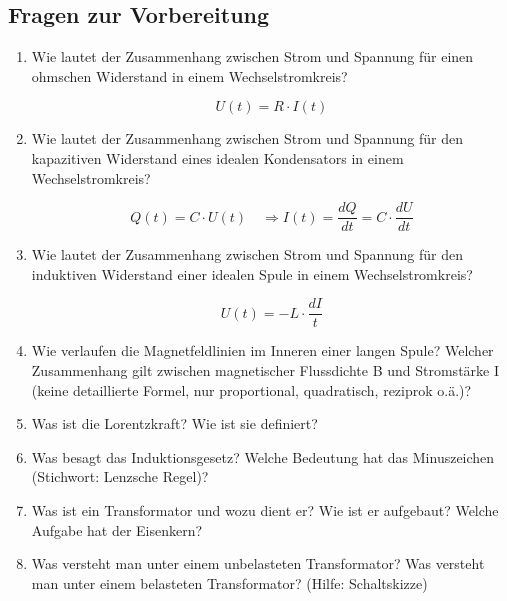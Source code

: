 \begin{tutorhint}
\section{Fragen zur Vorbereitung}


\begin{enumerate}
	\item Wie lautet der Zusammenhang zwischen Strom und Spannung für einen ohmschen Widerstand in einem Wechselstromkreis?
		\begin{solution}
			$$ U(t) = R\cdot I(t)$$
		\end{solution}
	\item Wie lautet der Zusammenhang zwischen Strom und Spannung für den kapazitiven Widerstand eines idealen Kondensators in einem Wechselstromkreis?
		\begin{solution}
			$$Q(t) = C\cdot U(t) \quad \Rightarrow I(t) = \frac{dQ}{dt} = C\cdot\frac{dU}{dt}$$
		\end{solution}
	\item Wie lautet der Zusammenhang zwischen Strom und Spannung für den induktiven Widerstand einer idealen Spule in einem Wechselstromkreis?
		\begin{solution}
			$$U(t) = -L\cdot\frac{dI}{t}$$
		\end{solution}
	\item Wie verlaufen die Magnetfeldlinien im Inneren einer langen Spule? Welcher Zusammenhang gilt zwischen magnetischer Flussdichte B und Stromstärke I (keine detaillierte Formel, nur proportional, quadratisch, reziprok o.ä.)?
	\item Was ist die Lorentzkraft? Wie ist sie definiert?
	\item Was besagt das Induktionsgesetz? Welche Bedeutung hat das Minuszeichen (Stichwort: Lenzsche Regel)?
	\item Was ist ein Transformator und wozu dient er? Wie ist er aufgebaut? Welche Aufgabe hat der Eisenkern?
	\item Was versteht man unter einem unbelasteten Transformator? Was versteht man unter einem belasteten Transformator? (Hilfe: Schaltskizze)
\end{enumerate}
\end{tutorhint}

